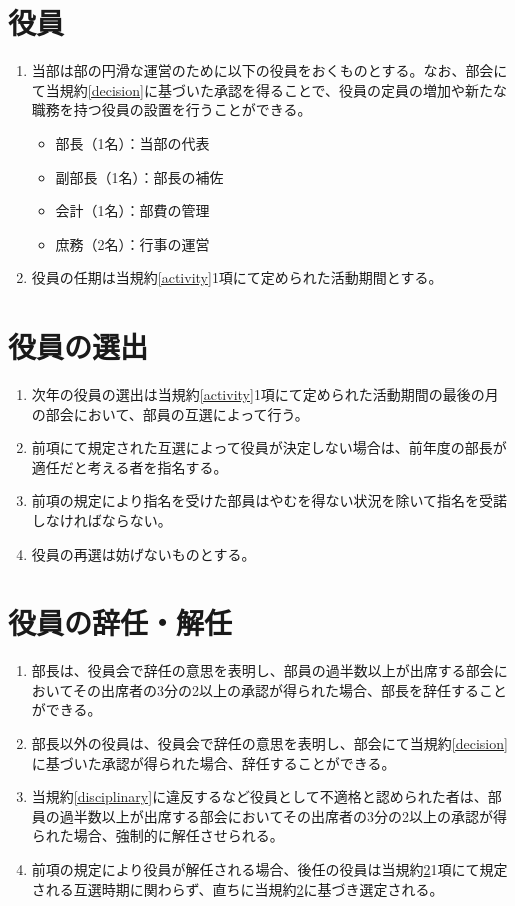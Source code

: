 \documentclass[12pt, unicode, a4paper]{ltjsreport}
\begin{document}
    \section{役員}\label{directors}
        \begin{enumerate}
            \item 当部は部の円滑な運営のために以下の役員をおくものとする。なお、部会にて当規約\ref{decision}に基づいた承認を得ることで、役員の定員の増加や新たな職務を持つ役員の設置を行うことができる。
            \begin{itemize}
                \item 部長（1名）：当部の代表
                \item 副部長（1名）：部長の補佐
                \item 会計（1名）：部費の管理
                \item 庶務（2名）：行事の運営
            \end{itemize}
            \item 役員の任期は当規約\ref{activity}1項にて定められた活動期間とする。
        \end{enumerate}

    \section{役員の選出}\label{election}
        \begin{enumerate}
            \item 次年の役員の選出は当規約\ref{activity}1項にて定められた活動期間の最後の月の部会において、部員の互選によって行う。
            \item 前項にて規定された互選によって役員が決定しない場合は、前年度の部長が適任だと考える者を指名する。
            \item 前項の規定により指名を受けた部員はやむを得ない状況を除いて指名を受諾しなければならない。
            \item 役員の再選は妨げないものとする。
        \end{enumerate}

    \section{役員の辞任・解任}\label{resignation}
        \begin{enumerate}
            \item 部長は、役員会で辞任の意思を表明し、部員の過半数以上が出席する部会においてその出席者の3分の2以上の承認が得られた場合、部長を辞任することができる。
            \item 部長以外の役員は、役員会で辞任の意思を表明し、部会にて当規約\ref{decision}に基づいた承認が得られた場合、辞任することができる。
            \item 当規約\ref{disciplinary}に違反するなど役員として不適格と認められた者は、部員の過半数以上が出席する部会においてその出席者の3分の2以上の承認が得られた場合、強制的に解任させられる。
            \item 前項の規定により役員が解任される場合、後任の役員は当規約\ref{election}1項にて規定される互選時期に関わらず、直ちに当規約\ref{election}に基づき選定される。
        \end{enumerate}
\end{document}
